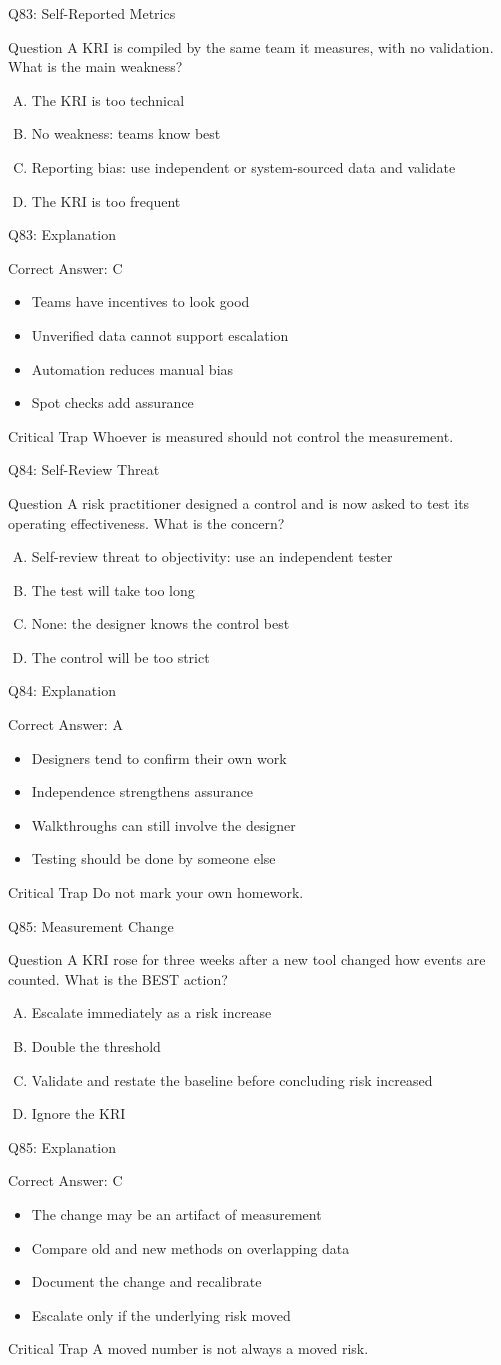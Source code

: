 \documentclass[aspectratio=169]{beamer}
\newcommand{\hq}[7]{%
  \begin{frame}{Q#1: #2}
    \begin{block}{Question}
      #3
    \end{block}
    \begin{enumerate}[(A)]
      #4
    \end{enumerate}
  \end{frame}
  \begin{frame}{Q#1: Explanation}
    \begin{block}{Correct Answer: #5}
      \begin{itemize}
        #6
      \end{itemize}
    \end{block}
    \begin{alertblock}{Critical Trap}
      #7
    \end{alertblock}
  \end{frame}
}
\begin{document}
\hq{83}{Self-Reported Metrics}
{A KRI is compiled by the same team it measures, with no validation. What is the main weakness?}
{\item The KRI is too technical
 \item No weakness: teams know best
 \item Reporting bias: use independent or system-sourced data and validate
 \item The KRI is too frequent}
{C}
{\item Teams have incentives to look good
 \item Unverified data cannot support escalation
 \item Automation reduces manual bias
 \item Spot checks add assurance}
{Whoever is measured should not control the measurement.}

\hq{84}{Self-Review Threat}
{A risk practitioner designed a control and is now asked to test its operating effectiveness. What is the concern?}
{\item Self-review threat to objectivity: use an independent tester
 \item The test will take too long
 \item None: the designer knows the control best
 \item The control will be too strict}
{A}
{\item Designers tend to confirm their own work
 \item Independence strengthens assurance
 \item Walkthroughs can still involve the designer
 \item Testing should be done by someone else}
{Do not mark your own homework.}

\hq{85}{Measurement Change}
{A KRI rose for three weeks after a new tool changed how events are counted. What is the BEST action?}
{\item Escalate immediately as a risk increase
 \item Double the threshold
 \item Validate and restate the baseline before concluding risk increased
 \item Ignore the KRI}
{C}
{\item The change may be an artifact of measurement
 \item Compare old and new methods on overlapping data
 \item Document the change and recalibrate
 \item Escalate only if the underlying risk moved}
{A moved number is not always a moved risk.}
\end{document}
